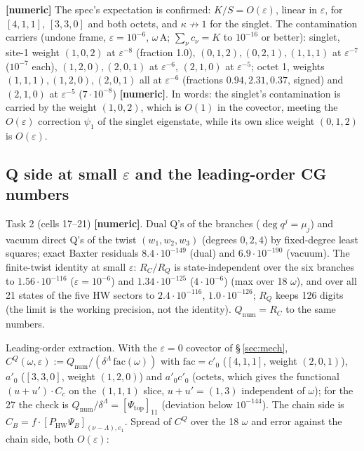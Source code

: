 \documentclass[10pt]{article}
\begin{document}
\textbf{[numeric]} The spec's expectation is confirmed: $K/S=O(\varepsilon)$, linear in $\varepsilon$, for $[4,1,1]$, $[3,3,0]$ and both octets, and $\kappa\not\to1$ for the singlet. The contamination carriers (undone frame, $\varepsilon=10^{-6}$, $\omega\,\mathrm{A}$; $\sum_\nu c_\nu=K$ to $10^{-16}$ or better): singlet, site-1 weight $(1,0,2)$ at $\varepsilon^{-8}$ (fraction 1.0), $(0,1,2),(0,2,1),(1,1,1)$ at $\varepsilon^{-7}$ ($10^{-7}$ each), $(1,2,0),(2,0,1)$ at $\varepsilon^{-6}$, $(2,1,0)$ at $\varepsilon^{-5}$; octet 1, weights $(1,1,1),(1,2,0),(2,0,1)$ all at $\varepsilon^{-6}$ (fractions $0.94,2.31,0.37$, signed) and $(2,1,0)$ at $\varepsilon^{-5}$ ($7\cdot10^{-8}$) \textbf{[numeric]}. In words: the singlet's contamination is carried by the weight $(1,0,2)$, which is $O(1)$ in the covector, meeting the $O(\varepsilon)$ correction $\psi_1$ of the singlet eigenstate, while its own slice weight $(0,1,2)$ is $O(\varepsilon)$.

\subsection{Q side at small $\varepsilon$ and the leading-order CG numbers}\label{sec:adjQ}

Task 2 (cells 17--21) \textbf{[numeric]}. Dual Q's of the branches ($\deg q^j=\mu_j$) and vacuum direct Q's of the twist $(w_1,w_2,w_3)$ (degrees $0,2,4$) by fixed-degree least squares; exact Baxter residuals $8.4\cdot10^{-149}$ (dual) and $6.9\cdot10^{-190}$ (vacuum). The finite-twist identity at small $\varepsilon$: $R_C/R_Q$ is state-independent over the six branches to $1.56\cdot10^{-116}$ ($\varepsilon=10^{-6}$) and $1.34\cdot10^{-125}$ ($4\cdot10^{-6}$) (max over 18 $\omega$), and over all 21 states of the five HW sectors to $2.4\cdot10^{-116}$, $1.0\cdot10^{-126}$; $R_Q$ keeps 126 digits (the limit is the working precision, not the identity). $Q_{\mathrm{num}}=R_C$ to the same numbers.

Leading-order extraction. With the $\varepsilon=0$ covector of \S\,\ref{sec:mech}, $C^Q(\omega,\varepsilon):=Q_{\mathrm{num}}/(\delta^\Lambda\,\mathrm{fac}(\omega))$ with $\mathrm{fac}=c'_0$ ($[4,1,1]$, weight $(2,0,1)$), $a'_0$ ($[3,3,0]$, weight $(1,2,0)$) and $a'_0c'_0$ (octets, which gives the functional $(u+u')\cdot C_c$ on the $(1,1,1)$ slice, $u+u'=(1,3)$ independent of $\omega$); for the 27 the check is $Q_{\mathrm{num}}/\delta^\Lambda=[\Psi_{\mathrm{top}}]_{11}$ (deviation below $10^{-144}$). The chain side is $C_B=f\cdot[P_{\mathrm{HW}}\Psi_B]_{(\nu-\Lambda),e_1}$. Spread of $C^Q$ over the 18 $\omega$ and error against the chain side, both $O(\varepsilon)$:
\end{document}
